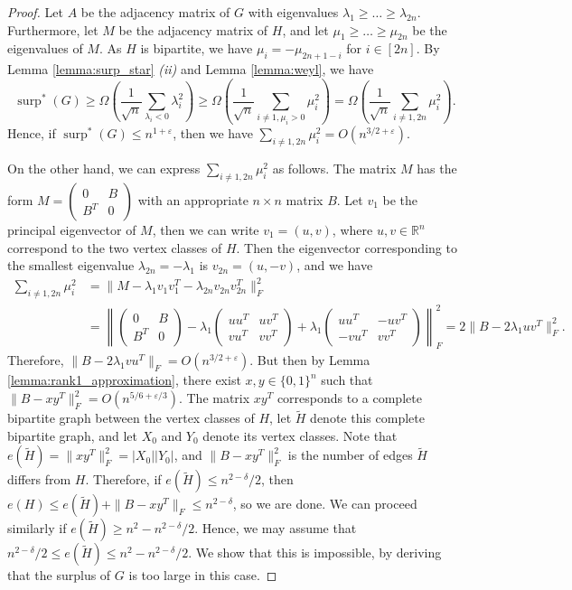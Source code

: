 \documentclass[11pt]{article}
\theoremstyle{plain}
\theoremstyle{definition}
\DeclareMathOperator{\surp}{surp}
\newcommand{\eps}{\varepsilon}
\begin{document}
\begin{proof}
Let $A$ be the adjacency matrix of $G$ with eigenvalues $\lambda_1\geq \dots\geq \lambda_{2n}$. Furthermore, let $M$ be the adjacency matrix of $H$, and let $\mu_1\geq \dots\geq \mu_{2n}$ be the eigenvalues of $M$. As $H$ is bipartite, we have $\mu_i=-\mu_{2n+1-i}$ for $i\in [2n]$. 
By Lemma \ref{lemma:surp_star} \textit{(ii)} and Lemma \ref{lemma:weyl}, we have
$$\surp^*(G)\geq \Omega\left(\frac{1}{\sqrt{n}}\sum_{\lambda_i<0}\lambda_i^2\right)\geq \Omega\left(\frac{1}{\sqrt{n}}\sum_{i\neq 1,\mu_i>0}\mu_i^2\right)=\Omega\left(\frac{1}{\sqrt{n}}\sum_{i\neq 1,2n}\mu_i^2\right).$$
Hence, if $\surp^*(G)\leq n^{1+\eps}$, then we have $\sum_{i\neq 1, 2n}\mu_i^2=O(n^{3/2+\eps})$.

On the other hand, we can express $\sum_{i\neq 1, 2n}\mu_i^2$ as follows. The matrix $M$ has the form $M=\begin{pmatrix}0 & B \\ B^T & 0\end{pmatrix}$ with an appropriate $n\times n$ matrix $B$. Let $v_1$ be the principal eigenvector  of $M$, then we can write $v_1=(u,v)$, where $u,v\in\mathbb{R}^n$ correspond to the two vertex classes of $H$. Then the eigenvector corresponding to the smallest eigenvalue $\lambda_{2n}=-\lambda_1$ is $v_{2n}=(u,-v)$, and we have
\begin{align*}
\sum_{i\neq 1,2n}\mu_i^2&=\|M-\lambda_1v_1v_1^T-\lambda_{2n}v_{2n}v_{2n}^T\|_F^2\\
&=\left\|\begin{pmatrix} 0 & B \\ B^T & 0\end{pmatrix}-\lambda_1\begin{pmatrix} uu^T & uv^T \\ vu^T & vv^T\end{pmatrix}+\lambda_1\begin{pmatrix} uu^T & -uv^T \\ -vu^T & vv^T\end{pmatrix}\right\|_F^2=2\|B-2\lambda_1uv^T\|_F^2.
\end{align*}
Therefore, $\|B-2\lambda_1vu^T\|_F=O(n^{3/2+\eps})$. But then by Lemma \ref{lemma:rank1_approximation}, there exist $x,y\in \{0,1\}^n$ such that $\|B-xy^T\|_F^2=O(n^{5/6+\eps/3})$. The matrix $xy^T$ corresponds to a complete bipartite graph between the vertex classes of $H$, let $\widetilde{H}$ denote this complete bipartite graph, and let $X_0$ and $Y_0$ denote its vertex classes. Note that $e(\widetilde{H})=\|xy^T\|_F^2=|X_0||Y_0|$, and $\|B-xy^T\|_F^2$ is the number of edges $\widetilde{H}$ differs from $H$.  Therefore, if $e(\widetilde{H})\leq n^{2-\delta}/2$, then $e(H)\leq e(\widetilde{H})+\|B-xy^T\|_F\leq n^{2-\delta}$, so we are done. We can proceed similarly if $e(\widetilde{H})\geq n^2-n^{2-\delta}/2$. Hence, we may assume that $n^{2-\delta}/2\leq e(\widetilde{H})\leq n^2-n^{2-\delta}/2$. We show that this is impossible, by deriving that the surplus of $G$ is too large in this case.


\end{proof}
\end{document}
